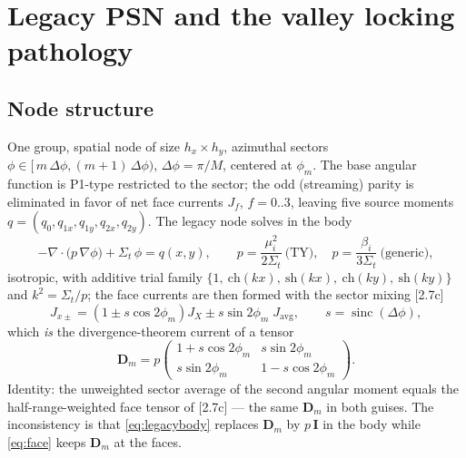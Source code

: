 \documentclass[11pt,a4paper]{article}
\begin{document}
\section{Legacy PSN and the valley locking pathology}
\label{sec:legacy}

\subsection{Node structure}
One group, spatial node of size $h_x \times h_y$, azimuthal sectors
$\phi \in [\,m\,\Delta\phi,(m{+}1)\,\Delta\phi)$,
$\Delta\phi=\pi/M$, centered at $\phi_m$.  The base angular function is
P1-type restricted to the sector; the odd (streaming) parity is
eliminated in favor of net face currents $J_f$, $f=0..3$, leaving five
source moments $q=(q_0,q_{1x},q_{1y},q_{2x},q_{2y})$.  The legacy node
solves in the body
\begin{equation}
-\nabla\!\cdot\!\big(p\,\nabla\phi\big) + \Sigma_t\,\phi = q(x,y),
\qquad p = \frac{\mu_i^2}{2\Sigma_t}\ \text{(TY)},\quad
p=\frac{\beta_i}{3\Sigma_t}\ \text{(generic)},
\label{eq:legacybody}
\end{equation}
isotropic, with additive trial family
$\{1,\ \mathrm{ch}(kx),\ \mathrm{sh}(kx),\ \mathrm{ch}(ky),\
\mathrm{sh}(ky)\}$ and $k^2=\Sigma_t/p$; the face currents are then
formed with the sector mixing [2.7c]
\begin{equation}
J_{x\pm} = \left(1 \pm s\cos 2\phi_m\right) J_X \pm s \sin 2\phi_m
\; J_{\mathrm{avg}}, \qquad s=\operatorname{sinc}(\Delta\phi),
\label{eq:face}
\end{equation}
which \emph{is} the divergence-theorem current of a tensor
\begin{equation}
\bm{D}_m = p\begin{pmatrix} 1+s\cos 2\phi_m & s\sin 2\phi_m \\
s\sin 2\phi_m & 1-s\cos 2\phi_m \end{pmatrix}.
\label{eq:Dm}
\end{equation}
Identity: the unweighted sector average of the second angular moment
equals the half-range-weighted face tensor of [2.7c] --- the same
$\bm{D}_m$ in both guises.  The inconsistency is that
\eqref{eq:legacybody} replaces $\bm{D}_m$ by $p\,\bm{I}$ in the body
while \eqref{eq:face} keeps $\bm{D}_m$ at the faces.
\end{document}
